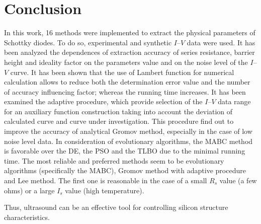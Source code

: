 \documentclass[aip,jap, amsmath,amssymb,reprint]{revtex4-1}
\begin{document}
\section{Conclusion}
In this work, 16 methods were implemented to extract the physical parameters of Schottky diodes.
To do so, experimental and synthetic $I$--$V$ data were used.
It has been analyzed the dependences of extraction accuracy of series resistance, barrier height and ideality factor on the parameters value and on the noise level of the $I$--$V$ curve.
It has been shown that the use of Lambert function for numerical calculation allows to reduce both the determination error value and the number of accuracy influencing factor; whereas the running time increases.
It has been examined the adaptive procedure, which provide selection of the $I$--$V$ data range for an auxiliary function construction taking into account the deviation of calculated curve and curve under investigation.
This procedure find out to improve the accuracy of analytical Gromov method, especially in the case of low noise level data.
In consideration of evolutionary algorithms, the MABC method is favorable over the DE, the PSO and the TLBO due to the minimal running time.
The most reliable and preferred methods seem to be evolutionary algorithms (specifically the MABC), Gromov method with adaptive procedure and Lee method.
The first one is reasonable in the case of
a small $R_s$ value (a few ohms) or a large $I_s$ value (high temperature).

Thus, ultrasound can be an effective tool for controlling silicon structure characteristics.


\end{document}
